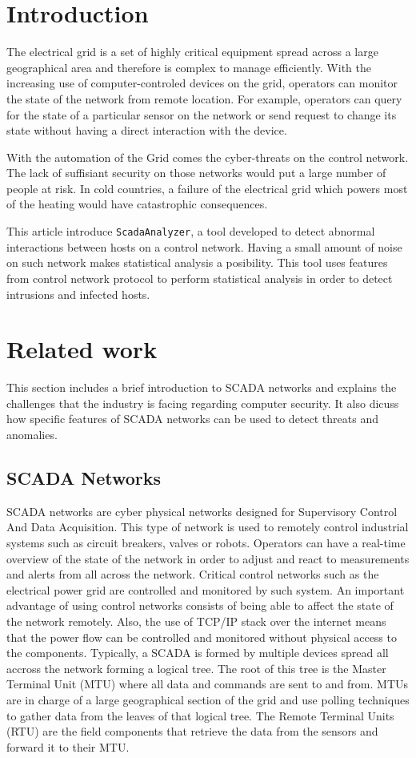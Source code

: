 \documentclass[12pt,journal,compsoc]{IEEEtran}
\begin{document}
\begin{empfile}
\section{Introduction}
The electrical grid is a set of highly critical equipment spread across a large geographical area and therefore is complex to manage efficiently. With the increasing use of computer-controled devices on the grid, operators can monitor the state of the network from remote location. For example, operators can query for the state of a particular sensor on the network or send request to change its state without having a direct interaction with the device.

With the automation of the Grid comes the cyber-threats on the control network. The lack of suffisiant security on those networks would put a large number of people at risk. In cold countries, a failure of the electrical grid which powers most of the heating would have catastrophic consequences.

This article introduce \texttt{ScadaAnalyzer}, a tool developed to detect abnormal interactions between hosts on a control network. Having a small amount of noise on such network makes statistical analysis a posibility. This tool uses features from control network protocol to perform statistical analysis in order to detect intrusions and infected hosts.

\section{Related work}
This section includes a brief introduction to SCADA networks and explains the challenges that the industry is facing regarding computer security. It also dicuss how specific features of SCADA networks can be used to detect threats and anomalies.
\subsection{SCADA Networks}
SCADA networks are cyber physical networks designed for Supervisory Control And Data Acquisition. This type of network is used to remotely control industrial systems such as circuit breakers, valves or robots\cite{lemay}. Operators can have a real-time overview of the state of the network in order to adjust and react to measurements and alerts from all across the network. Critical control networks such as the electrical power grid are controlled and monitored by such system. An important advantage of using control networks consists of being able to affect the state of the network remotely. Also, the use of TCP/IP stack over the internet means that the power flow can be controlled and monitored without physical access to the components\cite{lemay}. Typically, a SCADA is formed by multiple devices spread all accross the network forming a logical tree. The root of this tree is the Master Terminal Unit (MTU) where all data and commands are sent to and from. MTUs are in charge of a large geographical section of the grid and use polling techniques to gather data from the leaves of that logical tree. The Remote Terminal Units (RTU) are the field components that retrieve the data from the sensors and forward it to their MTU.


\end{empfile}
\end{document}
